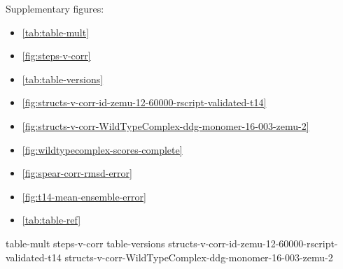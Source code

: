 

Supplementary figures:
\begin{itemize}
\item \cref{tab:table-mult}
\item \cref{fig:steps-v-corr}
\item \cref{tab:table-versions}
\item \cref{fig:structs-v-corr-id-zemu-12-60000-rscript-validated-t14}
\item \cref{fig:structs-v-corr-WildTypeComplex-ddg-monomer-16-003-zemu-2}
\item \cref{fig:wildtypecomplex-scores-complete}
\item \cref{fig:spear-corr-rmsd-error}
\item \cref{fig:t14-mean-ensemble-error}
\item \cref{tab:table-ref}
\end{itemize}

{table-mult}
{steps-v-corr}
{table-versions}
{structs-v-corr-id-zemu-12-60000-rscript-validated-t14}
{structs-v-corr-WildTypeComplex-ddg-monomer-16-003-zemu-2}

